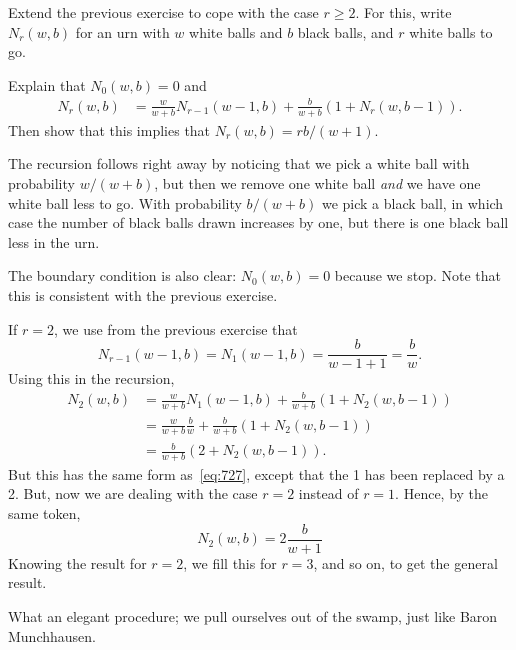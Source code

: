 \documentclass[lectures]{subfiles}
\begin{document}
\begin{exercise}
Extend the previous exercise to cope with the case $r\geq 2$.
For this, write $N_{r}(w,b)$ for an urn with $w$ white balls and $b$ black balls, and $r$ white balls to go.
\begin{hint}
Explain that $N_{0}(w,b) = 0$ and
\begin{align}
  N_r(w,b) &= \frac{w}{w+b} N_{r-1}(w-1, b) +  \frac{b}{w+b} (1+N_{r}(w, b-1)).
\end{align}
Then show that this implies that $N_{r}(w,b) = r b/ (w+1)$.
\end{hint}
\begin{solution}
The recursion follows right away by noticing that we pick a white ball with probability $w/(w+b)$, but then we remove one white ball \emph{and} we have one white ball less to go.
With probability $b/(w+b)$ we pick a black ball, in which case the number of black balls drawn increases by one, but there is one black ball less in the urn.

The boundary condition is also clear: $N_{0}(w,b)=0$ because we stop.
Note that this is consistent with the previous exercise.

If $r=2$, we use from the previous exercise that
\begin{equation*}
N_{r-1}(w-1, b) = N_{1}(w-1, b) = \frac{b }{w-1 + 1} = \frac{b }{w}.
\end{equation*}
Using this in the recursion,
\begin{align*}
  N_2(w,b)
&= \frac{w}{w+b} N_{1}(w-1, b) +  \frac{b}{w+b} (1+N_{2}(w, b-1)) \\
&= \frac{w}{w+b} \frac{b }{w} +  \frac{b}{w+b} (1+N_{2}(w, b-1)) \\
&=  \frac{b}{w+b} (2+N_{2}(w, b-1)).
\end{align*}
But this has the same form as~\cref{eq:727}, except that the 1 has been replaced by a 2. But, now we are dealing with the case $r=2$ instead of $r=1$. Hence, by the same token,
\begin{equation*}
  N_2(w,b) = 2 \frac{b}{w+1}
\end{equation*}
Knowing the result for $r=2$, we fill this for $r=3$, and so on, to get the general result.

What an elegant procedure;  we pull ourselves out of the swamp, just like Baron Munchhausen.
\end{solution}
\end{exercise}
\end{document}
